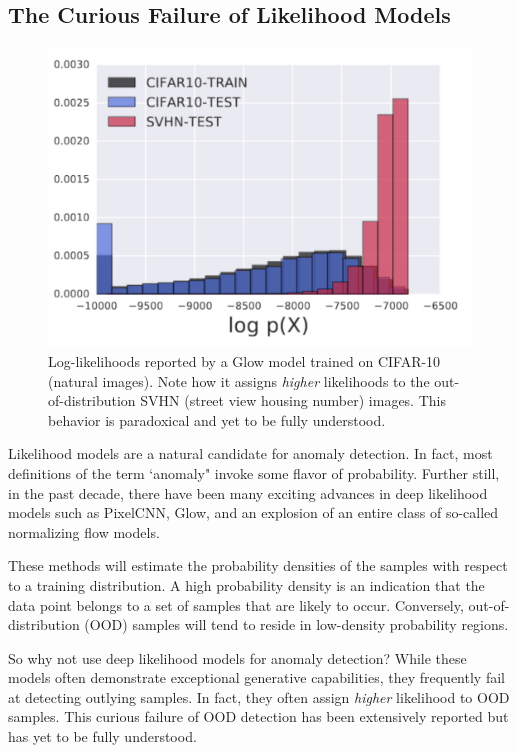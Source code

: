\subsection*{The Curious Failure of Likelihood Models}

\begin{figure}[tbhp]
    \centering
    \includegraphics[width=.6\textwidth]{figures/cifar_glow_nalisnick.png}
    \caption{Log-likelihoods reported by a Glow model trained on CIFAR-10 (natural images). Note how it assigns \textit{higher} likelihoods to the out-of-distribution SVHN (street view housing number) images. This behavior is paradoxical and yet to be fully understood.}
    \label{fig:cifar_glow}
\end{figure}

Likelihood models are a natural candidate for anomaly detection. In fact, most definitions of the term `anomaly" invoke some flavor of probability. Further still, in the past decade, there have been many exciting advances in deep likelihood models such as PixelCNN, Glow, and an explosion of an entire class of so-called normalizing flow models.

These methods will estimate the probability densities of the samples with respect to a training distribution. A high probability density is an indication that the data point belongs to a set of samples that are likely to occur.
Conversely, out-of-distribution (OOD) samples will tend to reside in low-density probability regions.


So why not use deep likelihood models for anomaly detection? While these models often demonstrate exceptional generative capabilities, they frequently fail at detecting outlying samples. In fact, they often assign \textit{higher} likelihood to OOD samples. This curious failure of OOD detection has been extensively reported \cite{nalisnick2018do,why_norm_fails,nalisnick2020detecting} but has yet to be fully understood.

